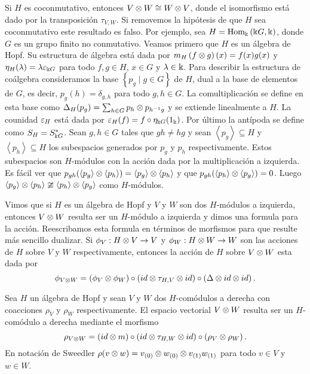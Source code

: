 \documentclass[a4paper,oneside,fleqn,11pt,../tesis.tex]{subfiles}
\begin{document}
Si $H$ es coconmutativo, entonces $V \otimes W \cong W \otimes V$, donde el isomorfismo está dado por la transposición $\tau_{V, W}$.
Si removemos la hipótesis de que $H$ sea coconmutativo este resultado es falso. Por ejemplo, sea $H = \operatorname{Hom}_{\Bbbk}\left(\Bbbk G, \Bbbk\right)$,
donde $G$ es un grupo finito no conmutativo. Veamos primero que $H$ es un álgebra de Hopf. Su estructura de álgebra está dada por 
$m_{H}\left(f \otimes g\right)(x) = f(x)g(x)$ y $\eta_{H}(\lambda) = \lambda\varepsilon_{\Bbbk G}$ para todo $f, g \in H$, $x \in G$ y $\lambda \in \Bbbk$.
Para describir la estructura de coálgebra consideramos la base $\left\lbrace p_g \mid g \in G \right\rbrace$ de $H$, dual a la base de elementos de $G$, es decir, $p_g(h) = \delta_{g, h}$ para todo $g, h \in G$. La comultiplicación se define en esta base como $\Delta_H(p_g) = \sum_{h \in G} p_h \otimes p_{h^{-1}g}$ y se extiende linealmente a $H$. La counidad $\varepsilon_{H}$ está dada por $\varepsilon_{H}(f) = f \circ \eta_{\Bbbk G}(1_{\Bbbk})$. Por último la
antípoda se define como $S_{H} = S_{\Bbbk G}^{\ast}$. Sean $g, h \in G$ tales que $gh \neq hg$ y sean
$\left\langle p_g \right\rangle \subseteq H$ y $\left\langle p_h \right\rangle \subseteq H$ los subespacios generados por $p_g$ y $p_h$ respectivamente.
Estos subespacios son $H$-módulos con la acción dada por la multiplicación a izquierda. Es fácil ver que
$p_{gh}(\left\langle p_g \right\rangle \otimes \left\langle p_h \right\rangle) = \left\langle p_g \right\rangle \otimes \left\langle p_h \right\rangle$ y que
$p_{gh}(\left\langle p_h \right\rangle \otimes \left\langle p_g \right\rangle) = 0$. Luego
$\left\langle p_g \right\rangle \otimes \left\langle p_h \right\rangle \ncong \left\langle p_h \right\rangle \otimes \left\langle p_g \right\rangle$
como $H$-módulos.

Vimos que si $H$ es un álgebra de Hopf y $V$ y $W$ son dos $H$-módulos a izquierda, entonces $V\otimes W$ resulta ser un $H$-módulo a izquierda y dimos
una formula para la acción. Reescribamos esta formula en términos de morfismos para que resulte más sencillo dualizar. Si $\phi_{V}: H \otimes V \to V$ y 
$\phi_W: H \otimes W \to W$ son las acciones de $H$ sobre $V$ y $W$ respectivamente, entonces la acción de $H$ sobre $V \otimes W$ esta dada por
\[
	\phi_{V \otimes W} = \left(\phi_V \otimes \phi_W \right) \circ \left(id \otimes \tau_{H, V} \otimes id \right) \circ \left(\Delta \otimes id \otimes id \right).
\]

Sea $H$ un álgebra de Hopf y sean $V$ y $W$ dos $H$-comódulos a derecha con coacciones $\rho_V$ y $\rho_W$ respectivamente. El espacio vectorial $V \otimes W$
resulta ser un $H$-comódulo a derecha mediante el morfismo
\[
	\rho_{V\otimes W} = \left(id \otimes m\right) \circ \left(id \otimes \tau_{H, W} \otimes id\right) \circ \left(\rho_V \otimes \rho_W \right).
\]
En notación de Sweedler $\rho(v\otimes w) = v_{(0)} \otimes w_{(0)} \otimes v_{(1)} w_{(1)}$ para todo $v \in V$ y $w \in W$.
\end{document}
